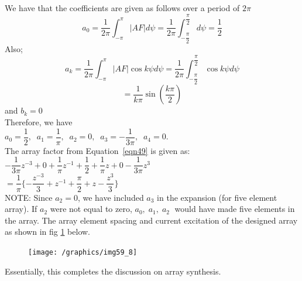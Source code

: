\begin{exmp}
We have that the coefficients are given as follows over a period of $2\pi$
$$a_0 = \dfrac{1}{2\pi}\int_{-\pi}^{\pi}|AF|d\psi = \dfrac{1}{2\pi}\int_{-\dfrac{\pi}{2}}^{\dfrac{\pi}{2}}d\psi = \frac{1}{2}$$
Also;
$$a_k = \dfrac{1}{2\pi}\int_{-\pi}^{\pi}|AF|\cos k\psi d\psi = \dfrac{1}{2\pi}\int_{-\dfrac{\pi}{2}}^{\dfrac{\pi}{2}}\cos k\psi d\psi$$
$$= \dfrac{1}{k\pi}\sin(\dfrac{k\pi}{2})$$ and $b_k = 0$\\
Therefore, we have\\
$ a_0 = \dfrac{1}{2}, \; \; a_1 = \dfrac{1}{\pi},\; \; a_2 = 0, \; \; a_3 = -\dfrac{1}{3\pi}, \; \;a_4 = 0$.\\
The array factor from Equation~\ref{eqn49} is given as:\\
$-\dfrac{1}{3\pi}z^{-3} + 0 +\dfrac{1}{\pi}z^{-1} + \dfrac{1}{2} + \dfrac{1}{\pi}z + 0 - \dfrac{1}{3\pi}z^{3}$\\
$= \dfrac{1}{\pi}\{
-\dfrac{z^{-3}}{3} + z^{-1} + \dfrac{\pi}{2} + z - \dfrac{z^3}{3}
\}$\\
NOTE: Since $a_2 = 0$, we have included $a_3$ in the expansion (for five element array). If $a_2$ were not equal to zero, $a_0, \; a_1, \; a_2 \;$ would have made five elements in the array. The array element spacing and current excitation of the designed array as shown in fig \ref{fig:fig-7} below.
\begin{figure}[h]
\centering
\texttt{[image: /graphics/img59\_8]}
\caption{}
\label{fig:fig-7}
\end{figure}

\end{exmp}
\begin{ExerciseList}
\Exercise[title=DIY]
\end{ExerciseList}

Essentially, this completes the discussion on array synthesis.